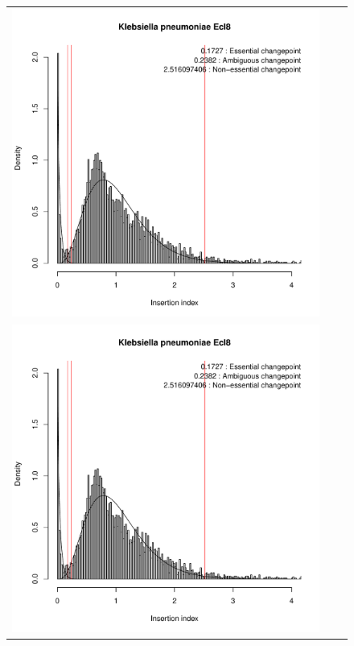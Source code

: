 \documentclass[12pt,letterpaper]{article}
\begin{document}
\begin{figure}
\begin{tabular}{c c c}
\includegraphics[page=3, scale=0.25]{essentiality.pdf}\\
\includegraphics[page=4, scale=0.25]{essentiality.pdf}&

\end{tabular}
\end{figure}
\end{document}
